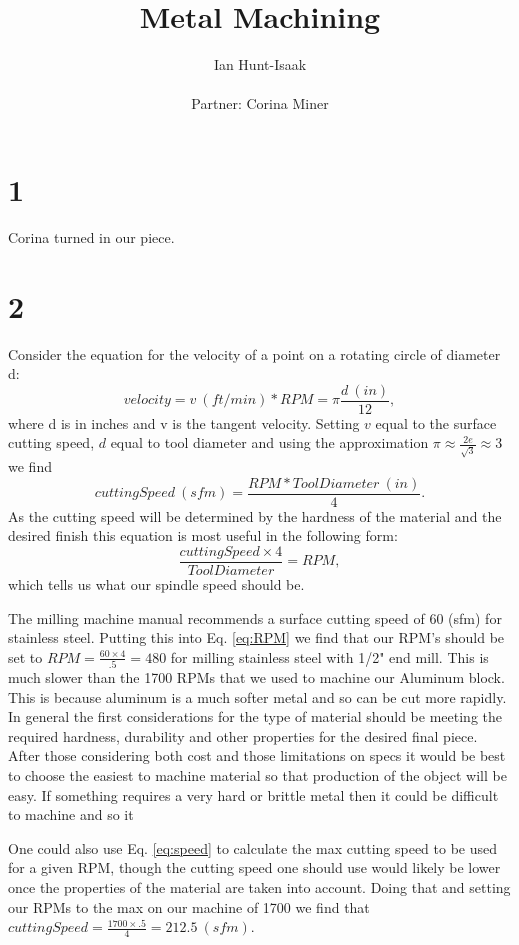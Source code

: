 \documentclass[11pt,letterpaper]{article}
\title{Metal Machining}
\author{Ian Hunt-Isaak\\ \begin{small}
Partner: Corina Miner
\end{small}}
\begin{document}
\date{}
\maketitle
\section*{1}
Corina turned in our piece.
\section*{2} %
Consider the equation for the velocity of a point on a rotating circle of diameter d:
\begin{equation}
velocity = v\ (ft/min) * RPM = \pi \frac{d\ (in)}{12},
\end{equation}
where d is in inches and v is the tangent velocity.
Setting $v$ equal to the surface cutting speed, $d$ equal to tool diameter and using the approximation $\pi \approx \frac{2e}{\sqrt{3}} \approx 3$ we find
\begin{equation}
\label{eq:speed}
cuttingSpeed\ (sfm)= \frac{RPM*Tool Diameter\ (in)}{4}.
\end{equation}
As the cutting speed will be determined by the hardness of the material and the desired finish this equation is most useful in the following form:
\begin{equation}
\label{eq:RPM}
\frac{cuttingSpeed \times 4}{ToolDiameter} = RPM,
\end{equation}
which tells us what our spindle speed should be. 

The milling machine manual recommends a surface cutting speed of 60 (sfm) for stainless steel. Putting this into Eq. \ref{eq:RPM} we find that our RPM's should be set to $RPM = \frac{60 \times 4}{.5} = 480$ for milling stainless steel with 1/2" end mill. This is much slower than the 1700 RPMs that we used to machine our Aluminum block. This is because aluminum is a much softer metal and so can be cut more rapidly. In general the first considerations for the type of material should be meeting the required hardness, durability and other properties for the desired final piece. After those considering both cost and those limitations on specs it would be best to choose the easiest to machine material so that production of the object will be easy. If something requires a very hard or brittle metal then it could be difficult to machine and so it 

One could also use Eq. \ref{eq:speed} to calculate the max cutting speed to be used for a given RPM, though the cutting speed one should use would likely be lower once the properties of the material are taken into account. Doing that and setting our RPMs to the max on our machine of 1700 we find that $cuttingSpeed = \frac{1700 \times .5}{4} =212.5\ (sfm)$.
\end{document}
